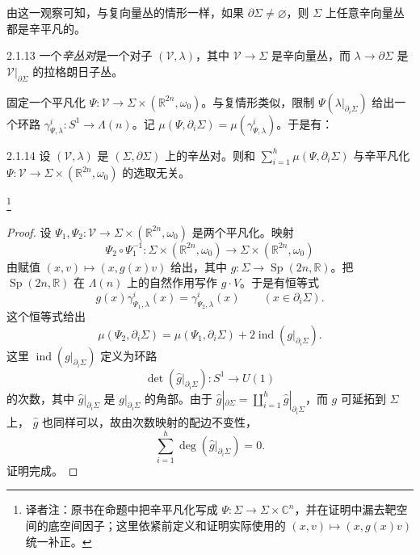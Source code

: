 由这一观察可知，与复向量丛的情形一样，如果
$\partial\Sigma\ne\varnothing$，则 $\Sigma$ 上任意辛向量丛都是辛平凡的。

\begin{definition}{2.1.13}\label{def:2-1-13}
一个\emph{辛丛对}是一个对子 $(\mathcal V,\lambda)$，其中
$\mathcal V\to\Sigma$ 是辛向量丛，而
$\lambda\to\partial\Sigma$ 是 $\mathcal V|_{\partial\Sigma}$ 的拉格朗日子丛。
\end{definition}

固定一个平凡化
$\Psi:\mathcal V\to\Sigma\times(\mathbb R^{2n},\omega_0)$。与复情形类似，限制
$\Psi(\lambda|_{\partial_i\Sigma})$ 给出一个环路
$\gamma^i_{\Psi,\lambda}:S^1\to\Lambda(n)$。记
$\mu(\Psi,\partial_i\Sigma)=\mu(\gamma^i_{\Psi,\lambda})$。于是有：

\begin{proposition}{2.1.14}\label{prop:2-1-14}
设 $(\mathcal V,\lambda)$ 是 $(\Sigma,\partial\Sigma)$ 上的辛丛对。则和
$\sum_{i=1}^h\mu(\Psi,\partial_i\Sigma)$ 与辛平凡化
$\Psi:\mathcal V\to\Sigma\times(\mathbb R^{2n},\omega_0)$ 的选取无关。
\end{proposition}

\footnote{译者注：原书在命题中把辛平凡化写成 $\Psi:\Sigma\to\Sigma\times\mathbb C^n$，并在证明中漏去靶空间的底空间因子；这里依紧前定义和证明实际使用的 $(x,v)\mapsto(x,g(x)v)$ 统一补正。}

\begin{proof}
设 $\Psi_1,\Psi_2:\mathcal V\to\Sigma\times(\mathbb R^{2n},\omega_0)$ 是两个平凡化。映射
\[
  \Psi_2\circ\Psi_1^{-1}:
  \Sigma\times(\mathbb R^{2n},\omega_0)\longrightarrow
  \Sigma\times(\mathbb R^{2n},\omega_0)
\]
由赋值 $(x,v)\mapsto(x,g(x)v)$ 给出，其中
$g:\Sigma\to\operatorname{Sp}(2n,\mathbb R)$。把
$\operatorname{Sp}(2n,\mathbb R)$ 在 $\Lambda(n)$ 上的自然作用写作 $g\cdot V$。于是有恒等式
\[
  g(x)\gamma^i_{\Psi_1,\lambda}(x)
  =\gamma^i_{\Psi_2,\lambda}(x)
  \qquad(x\in\partial_i\Sigma).
\]
这个恒等式给出
\[
  \mu(\Psi_2,\partial_i\Sigma)
  =\mu(\Psi_1,\partial_i\Sigma)
   +2\operatorname{ind}(g|_{\partial_i\Sigma}).
\]
这里 $\operatorname{ind}(g|_{\partial_i\Sigma})$ 定义为环路
\[
  \det(\widehat g|_{\partial_i\Sigma}):S^1\longrightarrow U(1)
\]
的次数，其中 $\widehat g|_{\partial_i\Sigma}$ 是
$g|_{\partial_i\Sigma}$ 的角部。由于
$\widehat g|_{\partial\Sigma}
=\coprod_{i=1}^h\widehat g|_{\partial_i\Sigma}$，而 $g$ 可延拓到 $\Sigma$ 上，
$\widehat g$ 也同样可以，故由次数映射的配边不变性，
\[
  \sum_{i=1}^h\deg(\widehat g|_{\partial_i\Sigma})=0.
\]
证明完成。
\end{proof}

